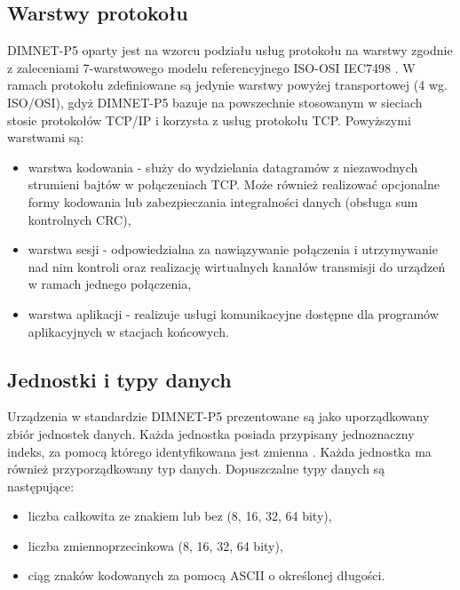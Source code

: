 \subsection{Warstwy protokołu}
DIMNET-P5 oparty jest na wzorcu podziału usług protokołu na warstwy zgodnie z zaleceniami 7-warstwowego modelu referencyjnego ISO-OSI IEC7498 \cite{dimnetp5-spec}. W ramach protokołu zdefiniowane są jedynie warstwy powyżej transportowej (4 wg. ISO/OSI), gdyż DIMNET-P5 bazuje na powszechnie stosowanym w sieciach stosie protokołów TCP/IP i korzysta z usług protokołu TCP. Powyższymi warstwami są:
\begin{itemize}
\item warstwa kodowania - służy do wydzielania datagramów z niezawodnych strumieni bajtów w połączeniach TCP. Może również realizować opcjonalne formy kodowania lub zabezpieczania integralności danych (obsługa sum kontrolnych CRC),
\item warstwa sesji - odpowiedzialna za nawiązywanie połączenia i utrzymywanie nad nim kontroli oraz realizację wirtualnych kanałów transmisji do urządzeń w ramach jednego połączenia,
\item warstwa aplikacji - realizuje usługi komunikacyjne dostępne dla programów aplikacyjnych w stacjach końcowych.
\end{itemize}

\subsection{Jednostki i typy danych}
Urządzenia w standardzie DIMNET-P5 prezentowane są jako uporządkowany zbiór jednostek danych. Każda jednostka posiada przypisany jednoznaczny indeks, za pomocą którego identyfikowana jest zmienna \cite{dimnetp5-spec}. Każda jednostka ma również przyporządkowany typ danych. Dopuszczalne typy danych są następujące:
\begin{itemize}
\item liczba całkowita ze znakiem lub bez (8, 16, 32, 64 bity),
\item liczba zmiennoprzecinkowa (8, 16, 32, 64 bity),
\item ciąg znaków kodowanych za pomocą ASCII o określonej długości.
\end{itemize}

